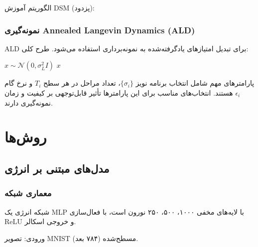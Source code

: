 الگوریتم آموزش DSM (پزدود):
\begin{algorithm}[H]
\caption{DSM	extunderscore Training}
\begin{latin}
\end{latin}
\end{algorithm}

\subsubsection{نمونه‌گیری Annealed Langevin Dynamics (ALD)}
ALD برای تبدیل امتیازهای یادگرفته‌شده به نمونه‌برداری استفاده می‌شود. طرح کلی:
\begin{algorithm}[H]
\caption{ALD}
\begin{latin}
$x \sim \mathcal{N}(0, \sigma_L^2 I)$
\Return $x$
\end{latin}
\end{algorithm}

پارامترهای مهم شامل انتخاب برنامه نویز \(\{\sigma_i\}\)، تعداد مراحل در هر سطح \(T_i\) و نرخ گام \(\epsilon_i\) هستند. انتخاب‌های مناسب برای این پارامترها تأثیر قابل‌توجهی بر کیفیت و زمان نمونه‌گیری دارند.

\section{روش‌ها}
\subsection{مدل‌های مبتنی بر انرژی}
\subsubsection{معماری شبکه}
شبکه انرژی یک MLP با لایه‌های مخفی ۱۰۰۰، ۵۰۰، ۲۵۰ نورون است، با فعال‌سازی ReLU و خروجی اسکالر.

ورودی: تصویر MNIST مسطح‌شده (۷۸۴ بعد).

